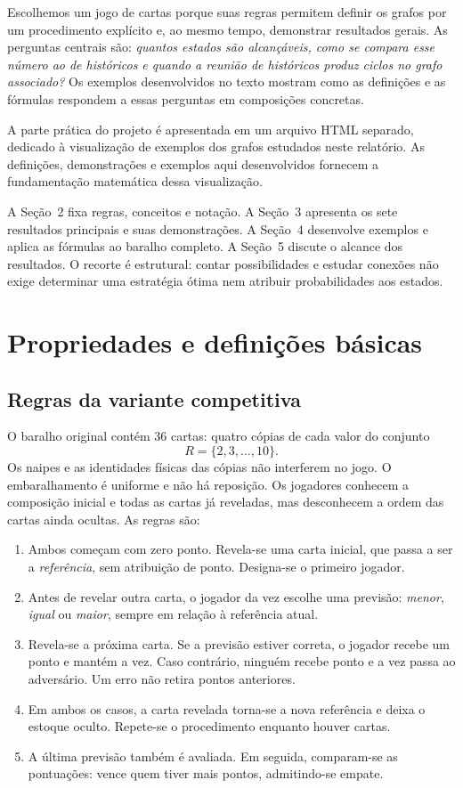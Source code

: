 \documentclass[11pt,a4paper]{article}
\theoremstyle{definition}
\newcommand{\proxpagina}{\newpage}
\begin{document}
Escolhemos um jogo de cartas porque suas regras permitem definir os grafos por um procedimento explícito e, ao mesmo tempo, demonstrar resultados gerais. As perguntas centrais são: \emph{quantos estados são alcançáveis, como se compara esse número ao de históricos e quando a reunião de históricos produz ciclos no grafo associado?} Os exemplos desenvolvidos no texto mostram como as definições e as fórmulas respondem a essas perguntas em composições concretas.

A parte prática do projeto é apresentada em um arquivo HTML separado, dedicado à visualização de exemplos dos grafos estudados neste relatório. As definições, demonstrações e exemplos aqui desenvolvidos fornecem a fundamentação matemática dessa visualização.

A Seção~2 fixa regras, conceitos e notação. A Seção~3 apresenta os sete resultados principais e suas demonstrações. A Seção~4 desenvolve exemplos e aplica as fórmulas ao baralho completo. A Seção~5 discute o alcance dos resultados. O recorte é estrutural: contar possibilidades e estudar conexões não exige determinar uma estratégia ótima nem atribuir probabilidades aos estados.

\proxpagina
\section{Propriedades e definições básicas}
\subsection{Regras da variante competitiva}
O baralho original contém 36 cartas: quatro cópias de cada valor do conjunto
\[
R=\{2,3,\ldots,10\}.
\]
Os naipes e as identidades físicas das cópias não interferem no jogo. O embaralhamento é uniforme e não há reposição. Os jogadores conhecem a composição inicial e todas as cartas já reveladas, mas desconhecem a ordem das cartas ainda ocultas. As regras são:
\begin{enumerate}
\item Ambos começam com zero ponto. Revela-se uma carta inicial, que passa a ser a \emph{referência}, sem atribuição de ponto. Designa-se o primeiro jogador.
\item Antes de revelar outra carta, o jogador da vez escolhe uma previsão: \emph{menor}, \emph{igual} ou \emph{maior}, sempre em relação à referência atual.
\item Revela-se a próxima carta. Se a previsão estiver correta, o jogador recebe um ponto e mantém a vez. Caso contrário, ninguém recebe ponto e a vez passa ao adversário. Um erro não retira pontos anteriores.
\item Em ambos os casos, a carta revelada torna-se a nova referência e deixa o estoque oculto. Repete-se o procedimento enquanto houver cartas.
\item A última previsão também é avaliada. Em seguida, comparam-se as pontuações: vence quem tiver mais pontos, admitindo-se empate.
\end{enumerate}
\end{document}
